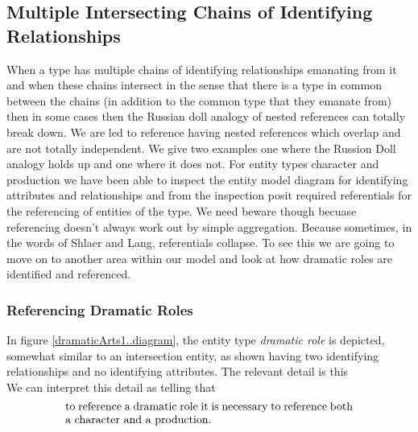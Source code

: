 \subsection{Multiple Intersecting Chains of Identifying Relationships}
When a type has multiple chains of identifying relationships emanating from it and when these chains intersect in the sense that there is a type in common between the chains (in addition to the
common type that they emanate from) then in some cases then the Russian doll analogy of nested references can totally break down. We are led to reference having nested references which overlap and are not totally independent. We give two examples one where the Russion Doll analogy holds up and one where it does not. 
For entity types character and production we have been able to inspect the entity model diagram for identifying  attributes and relationships and from the inspection posit required referentials  for the referencing of entities of the type.
We need beware though becuase referencing doesn't always work out by simple aggregation. Because sometimes,
in the words of Shlaer and Lang, referentials collapse. 
To see this we are going to move on to another area within our model and look at how dramatic roles are identified and referenced.

 \subsubsection{Referencing Dramatic Roles}
\mynote
In figure \ref{dramaticArts1..diagram}, the entity type \textit{dramatic role} is
depicted, somewhat similar to an intersection entity, as shown having
two identifying relationships and no identifying attributes.
The relevant detail is  this
\begin{equation*}

\end{equation*}
We can interpret this detail as telling that
\begin{equation}
\label{DramaticRoleReferencing}
\text{\parbox{9cm}{to reference a dramatic role it is necessary  
to reference both a character and  a production.}}
\end{equation}

